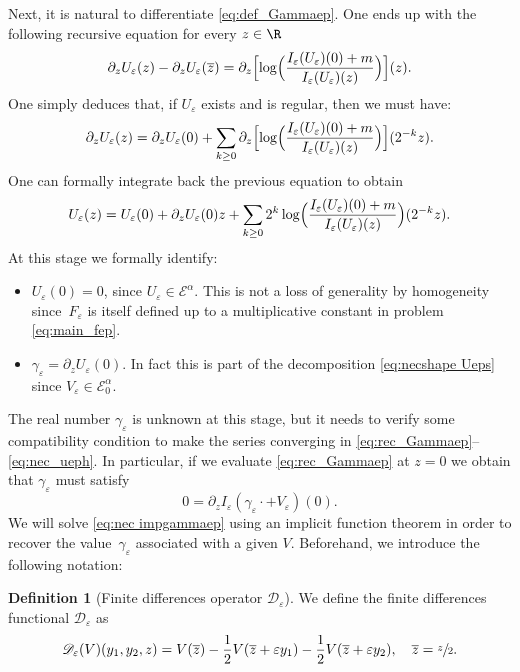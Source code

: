 \documentclass[JEP,XML,SOM,Unicode]{cedram}
\let\mathcal\mathscr
\theoremstyle{plain}
\theoremstyle{definition}
\newtheorem{definition}[thm]{Definition}
\newcommand{\D}{\mathcal{D}_\eps}
\let\eps\varepsilon
\let\ds\displaystyle
\newcommand{\Ea}{\mathcal{E}^\alpha}
\newcommand{\Eaz}{\mathcal{E}^\alpha_0}
\newcommand{\bz}{\overline{z}}
\newcommand{\iep}[1]{I_\varepsilon (U_\varepsilon)(#1)}
\begin{document}
Next, it is natural to differentiate \eqref{eq:def_Gammaep}.
One ends up with the following recursive equation for every $z \in \R$
\begin{equation}\label{eq:rec_Gammaep}
\partial_z U_\eps (z) - \partial_z U_\eps(\bz)= \partial_z \Bigl[ \log \Bigl(\dfrac{I_\eps(U_\eps)(0) + m}{I_\eps(U_\eps)(z)} \Bigr) \Bigr] (z).
\end{equation}
One simply deduces that, if $U_\eps$ exists and is regular, then we must have:
\begin{equation*}
\ds \partial_z U_\eps(z)= \partial_z U_\eps (0) + \sum_{k \geq 0}\partial_z \Bigl[ \log \Bigl(\dfrac{I_\eps(U_\eps)(0) + m}{I_\eps(U_\eps)(z)} \Bigr) \Bigr] (2^{-k}z).
\end{equation*}
One can formally integrate back the previous equation to obtain
\begin{equation}\label{eq:nec_ueph}
\ds U_\eps(z)= U_\eps(0) + \partial_z U_\eps (0)z + \sum_{k\geq 0} 2^k \log \Bigl(\dfrac{\iep{0}+ m}{I_\eps(U_\eps)(z)} \Bigr) (2^{-k}z).
\end{equation}
At this stage we formally identify:
\begin{itemize}
\item $U_\eps(0)=0$, since $U_\eps \in \Ea$. This is not a loss of generality by homogeneity since~$F_\eps$ is itself defined up to a multiplicative constant in problem \eqref{eq:main_fep}.
\item $\gamma_\eps = \partial_z U_\eps(0)$. In fact this is part of the decomposition \eqref{eq:necshape Ueps} since $V_\eps \in \Eaz$.
\end{itemize}
The real number $\gamma_\eps$ is unknown at this stage, but it needs to verify some compatibility condition to make the series converging in \eqref{eq:rec_Gammaep}--\eqref{eq:nec_ueph}. In particular, if we evaluate \eqref{eq:rec_Gammaep} at $z=0$ we obtain that $\gamma_\eps$ must satisfy
\begin{equation}\label{eq:nec impgammaep}
0 = \partial_z I_\eps(\gamma_\eps \cdot + V_\eps) (0).
\end{equation}
We will solve \eqref{eq:nec impgammaep} using an implicit function theorem in order to recover the value~$\gamma_\eps$ associated with a given $V$.
Beforehand, we introduce the following notation:
\begin{definition}[Finite differences operator $\D$]
We define the finite differences functional $\D$ as
\begin{equation*}
\D(V)(y_1,y_2,z) = V(\bz) - \frac12 V(\bz +\eps y_1) - \frac12 V(\bz +\eps y_2), \quad \bz = \sfrac{z}{2}.
\end{equation*}
\end{definition}
\end{document}
